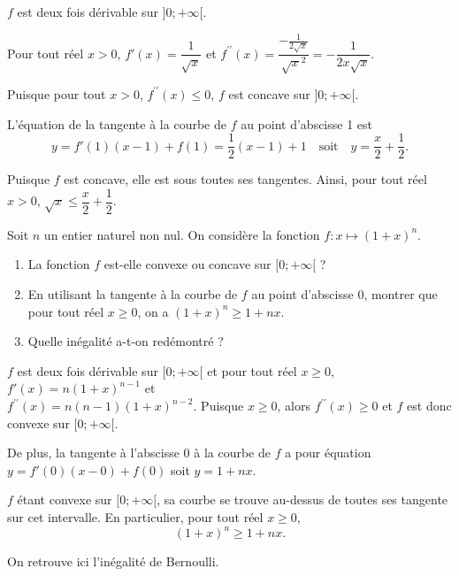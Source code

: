 \documentclass[11pt,fleqn, openany]{book} %
\begin{document}
\begin{solution}
\(f\) est deux fois dérivable sur \(]0;+\infty [\).

Pour tout réel \(x>0\), \(f'(x)=\dfrac{1}{\sqrt{x}}\) et $f^{\prime\prime}(x)=\dfrac{-\frac{1}{2\sqrt{x}}}{\sqrt{x}^2}=-\dfrac{1}{2x\sqrt{x}}$.

Puisque pour tout \(x>0\), \(f^{\prime\prime}(x)\leqslant 0\), \(f\) est concave sur \(]0;+\infty[\).

L'équation de la tangente à la courbe de \(f\) au point d'abscisse 1 est
\[ y=f'(1)(x-1)+f(1)=\dfrac{1}{2}(x-1)+1\quad\text{soit}\quad y=\dfrac{x}{2}+\dfrac{1}{2}.\]

 Puisque \(f\) est concave, elle est sous toutes ses tangentes. Ainsi, pour tout réel \(x>0\), \(\sqrt{x} \leqslant \dfrac{x}{2}+\dfrac{1}{2}\).
\end{solution}




\begin{exercise}Soit $n$ un entier naturel non nul. On considère la fonction $f:x\mapsto (1+x)^n$.
\begin{enumerate}
\item La fonction $f$ est-elle convexe ou concave sur $[0;+\infty[$ ?
\item En utilisant la tangente à la courbe de $f$ au point d'abscisse 0, montrer que pour tout réel $x\geqslant 0$,  on a $(1+x)^n \geqslant 1+nx$.
\item Quelle inégalité a-t-on redémontré ?
\end{enumerate}\end{exercise}

\begin{solution}\(f\) est deux fois dérivable sur \([0;+\infty[\) et pour tout réel \(x\geqslant 0\), \(f'(x)=n(1+x)^{n-1}\) et \\ \(f^{\prime\prime}(x)=n(n-1)(1+x)^{n-2}\). Puisque $x\geqslant 0$, alors \(f^{\prime\prime}(x) \geqslant 0\) et \(f\) est donc convexe sur \([0;+\infty[\).

De plus, la tangente à l'abscisse 0 à la courbe de \(f\) a pour équation \(y=f'(0)(x-0)+f(0)\) soit \(y=1+nx\).

\(f\) étant convexe sur \([0;+\infty[\), sa courbe se trouve au-dessus de toutes ses tangente sur cet intervalle. En particulier, pour tout réel \(x\geqslant 0\), 
\[(1+x)^n \geqslant 1+nx .\]

On retrouve ici l'inégalité de Bernoulli.\end{solution}
\end{document}
